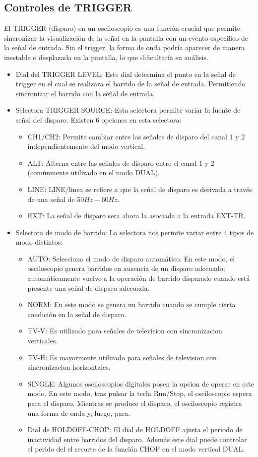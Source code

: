 \subsection{Controles de TRIGGER}
\label{MCtrigger}
El TRIGGER (disparo) en un osciloscopio es una función crucial que permite sincronizar la visualización de la señal en la pantalla con un evento específico de la señal de entrada. Sin el trigger, la forma de onda podría aparecer de manera inestable o desplazada en la pantalla, lo que dificultaría su análisis.
\begin{itemize}
    \item Dial del TRIGGER LEVEL: Este dial determina el punto en la señal de trigger en el cual se realizara el barrido de la señal de entrada. Permitiendo sincronizar el barrido con la señal de entrada.
    \item Selectora TRIGGER SOURCE: Esta selectora permite variar la fuente de señal del disparo. Existen 6 opciones en esta selectora:
    \begin{itemize}
        \item CH1/CH2: Permite cambiar entre las señales de disparo del canal 1 y 2 independientemente del modo vertical. 
        \item ALT: Alterna entre las señales de disparo entre el canal 1 y 2 (comúnmente utilizado en el modo DUAL).
        \item LINE: LINE/linea se refiere a que la señal de disparo es derivada a través de una señal de $50Hz-60Hz$.
        \item EXT: La señal de disparo sera ahora la asociada a la entrada EXT-TR.
    \end{itemize}
    \item Selectora de modo de barrido:
    La selectora nos permite variar entre 4 tipos de modo distintos:
    \begin{itemize}
        \item AUTO: Selecciona el modo de disparo automático. En este modo, el osciloscopio genera barridos en ausencia de un disparo adecuado; automáticamente vuelve a la operación de barrido disparado cuando está presente una señal de disparo adecuada.
        \item NORM: En este modo se genera un barrido cuando se cumple cierta condición en la señal de disparo.
        \item TV-V: Es utilizado para señales de television con sincronizacion verticales.
        \item TV-H: Es mayormente utilizado para señales de television con sincronizacion horizontales.
        \item SINGLE: Algunos osciloscopios digitales posen la opcion de operar en este modo. En este modo, tras pulsar la tecla Run/Stop, el osciloscopio espera para el disparo. Mientras se produce el disparo, el osciloscopio registra una forma de onda y, luego, para.


\item Dial de HOLDOFF-CHOP: El dial de HOLDOFF ajusta el periodo de inactividad entre barridos del disparo. Además este dial puede controlar el perido del el recorte de la función CHOP en el modo vertical DUAL.
    \end{itemize}
\end{itemize}


